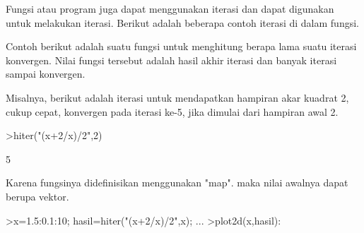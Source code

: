 \documentclass[a4paper,10pt]{article}
\begin{document}
\begin{eulernotebook}
\begin{eulercomment}
\begin{eulercomment}
\begin{eulercomment}
\begin{eulercomment}
\begin{eulercomment}
\begin{eulercomment}
\begin{eulercomment}
\begin{eulercomment}
\begin{eulercomment}
\begin{eulercomment}
\begin{eulercomment}
\begin{eulercomment}
\begin{eulercomment}
\begin{eulercomment}
\begin{eulercomment}
\begin{eulercomment}
\begin{eulercomment}
\begin{eulercomment}
\begin{eulercomment}
\begin{eulercomment}
\begin{eulercomment}
\begin{eulercomment}
\begin{eulercomment}
\begin{eulercomment}
\begin{eulercomment}
\begin{eulercomment}
\begin{eulercomment}
\begin{eulercomment}
\begin{eulercomment}
\begin{eulercomment}
\begin{eulercomment}
\begin{eulercomment}
\begin{eulercomment}
\begin{eulercomment}
\begin{eulercomment}
\begin{eulercomment}
\begin{eulercomment}
Fungsi atau program juga dapat menggunakan iterasi dan dapat digunakan
untuk melakukan iterasi. Berikut adalah beberapa contoh iterasi di
dalam fungsi.

Contoh berikut adalah suatu fungsi untuk menghitung berapa lama suatu
iterasi konvergen. Nilai fungsi tersebut adalah hasil akhir iterasi
dan banyak iterasi sampai konvergen.
\end{eulercomment}
\begin{eulercomment}
Misalnya, berikut adalah iterasi untuk mendapatkan hampiran akar
kuadrat 2, cukup cepat, konvergen pada iterasi ke-5, jika dimulai dari
hampiran awal 2.
\end{eulercomment}
\begin{eulerprompt}
>hiter("(x+2/x)/2",2)
\end{eulerprompt}
\begin{euleroutput}
  5
\end{euleroutput}
\begin{eulercomment}
Karena fungsinya didefinisikan menggunakan "map". maka nilai awalnya
dapat berupa vektor.
\end{eulercomment}
\begin{eulerprompt}
>x=1.5:0.1:10; hasil=hiter("(x+2/x)/2",x); ...
>plot2d(x,hasil):
\end{eulerprompt}

\end{eulercomment}
\end{eulercomment}
\end{eulercomment}
\end{eulercomment}
\end{eulercomment}
\end{eulercomment}
\end{eulercomment}
\end{eulercomment}
\end{eulercomment}
\end{eulercomment}
\end{eulercomment}
\end{eulercomment}
\end{eulercomment}
\end{eulercomment}
\end{eulercomment}
\end{eulercomment}
\end{eulercomment}
\end{eulercomment}
\end{eulercomment}
\end{eulercomment}
\end{eulercomment}
\end{eulercomment}
\end{eulercomment}
\end{eulercomment}
\end{eulercomment}
\end{eulercomment}
\end{eulercomment}
\end{eulercomment}
\end{eulercomment}
\end{eulercomment}
\end{eulercomment}
\end{eulercomment}
\end{eulercomment}
\end{eulercomment}
\end{eulercomment}
\end{eulercomment}
\end{eulernotebook}
\end{document}
